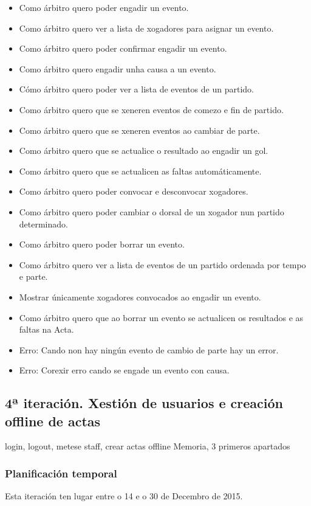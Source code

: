         \begin{itemize}
          \item Como árbitro quero poder engadir un evento.
          \item Como árbitro quero ver a lista de xogadores para asignar un 
evento.
          \item Como árbitro quero poder confirmar engadir un evento.
          \item Como árbitro quero engadir unha causa a un evento.
          \item Cómo árbitro quero poder ver a lista de eventos de un partido.
          \item Como árbitro quero que se xeneren eventos de comezo e fin de 
partido.
          \item Como árbitro quero que se xeneren eventos ao cambiar de parte.
          \item Como árbitro quero que se actualice o resultado ao engadir un 
gol.
          \item Como árbitro quero que se actualicen as faltas automáticamente.
          \item Como árbitro quero poder convocar e desconvocar xogadores.
          \item Como árbitro quero poder cambiar o dorsal de un xogador nun 
partido determinado.
          \item Como árbitro quero poder borrar un evento.
          \item Como árbitro quero ver a lista de eventos de un partido 
ordenada por tempo e parte.
          \item Mostrar únicamente xogadores convocados ao engadir un evento.
          \item Como árbitro quero que ao borrar un evento se actualicen os 
resultados e as faltas na Acta.
          \item Erro: Cando non hay ningún evento de cambio de parte hay un 
error.
          \item Erro: Corexir erro cando se engade un evento con causa.
        \end{itemize}

    \subsection{4ª iteración. Xestión de usuarios e creación offline de actas}
    
    login, logout, metese staff, crear actas offline
    Memoria, 3 primeros apartados
      \subsubsection{Planificación temporal}
      Esta iteración ten lugar entre o 14 e o 30 de Decembro de 2015.

